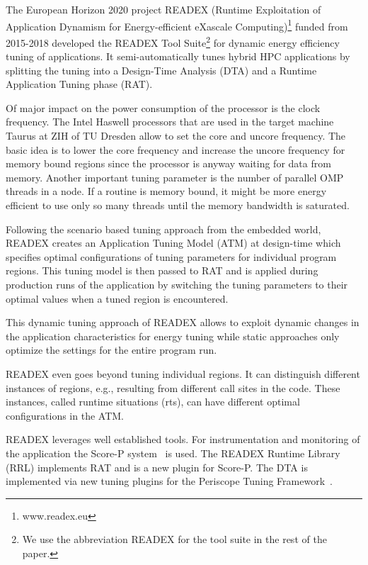 \documentclass[runningheads]{llncs}
\begin{document}
The European Horizon 2020 project READEX (Runtime Exploitation of Application Dynamism for Energy-efficient eXascale Computing)\footnote{www.readex.eu} funded from 2015-2018 developed the READEX Tool Suite\footnote{We use the abbreviation READEX for the tool suite in the rest of the paper.} for dynamic energy efficiency tuning of applications. It semi-automatically tunes hybrid HPC applications by splitting the tuning into a Design-Time Analysis (DTA) and a Runtime Application Tuning phase (RAT). 

Of major impact on the power consumption of the processor is the clock frequency. The Intel Haswell processors that are used in the target machine Taurus at ZIH of TU Dresden allow to set the core and  uncore frequency. The basic idea is to lower the core frequency and increase the uncore frequency for memory bound regions since the processor is anyway waiting for data from memory.  Another important tuning parameter is the number of parallel OMP threads in a node. If a routine is memory bound, it might be more energy efficient to use only so many threads until the memory bandwidth is saturated. 

Following the scenario based tuning approach \cite{filippopoulos2013exploration} from the embedded world, READEX creates an Application Tuning Model (ATM) at design-time which specifies optimal configurations of tuning parameters for individual program regions. This tuning model is then passed to RAT and is applied during production runs of the application by switching the tuning parameters to their optimal values when a tuned region is encountered. 

This dynamic tuning approach of READEX allows to exploit dynamic changes in the application characteristics for energy tuning while static approaches only optimize the settings for the entire program run. 

READEX even goes beyond tuning individual regions. It can distinguish different instances of regions, e.g., resulting from different call sites in the code. These instances, called runtime situations (rts), can have different optimal configurations in the ATM. 

READEX leverages well established tools. For instrumentation and monitoring of the application the Score-P system~\cite{knupfer2012score} is used. The READEX Runtime Library (RRL) implements RAT and is a new plugin for Score-P. The DTA is implemented via new tuning plugins for the Periscope Tuning Framework~\cite{PTF2.0IEEE2016}.  
\end{document}
